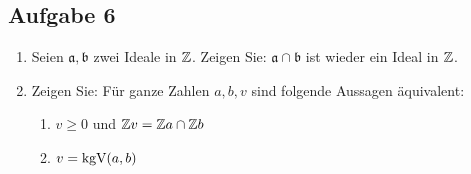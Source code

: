 \subsection{Aufgabe 6}
\begin{enumerate}[label=\alph*)]
  \item Seien $\mathfrak{a},\mathfrak{b}$ zwei Ideale in $\mathbb{Z}$. Zeigen Sie:
        $\mathfrak{a} \cap \mathfrak{b}$ ist wieder ein Ideal in $\mathbb{Z}$.
  \item Zeigen Sie: Für ganze Zahlen $a,b,v$ sind folgende Aussagen äquivalent:
        \begin{enumerate}[label=\roman*)]
          \item $v \geq 0$ und
                $\mathbb{Z}{}v = \mathbb{Z}{}a \cap \mathbb{Z}{}b$
          \item $v = \text{kgV}(a,b)$
        \end{enumerate}
\end{enumerate}

